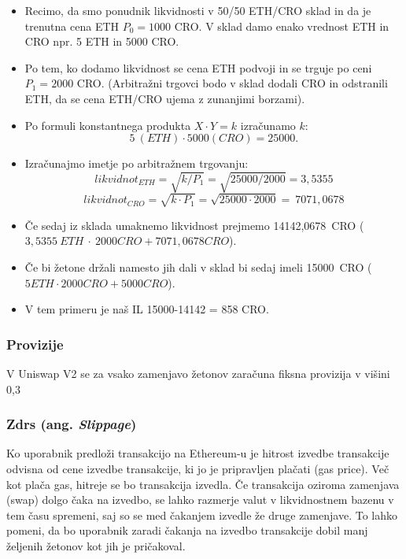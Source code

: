 \documentclass[a4paper,12pt]{article}%
\begin{document}
\begin{itemize}
    \item Recimo, da smo ponudnik likvidnosti v 50/50 ETH/CRO sklad in da je trenutna cena ETH $P_0 = 1000$ CRO. V sklad damo enako vrednost ETH in CRO npr. 5 ETH in 5000 CRO. 
    \item Po tem, ko dodamo likvidnost se cena ETH podvoji in se trguje po ceni $P_1 = 2000$ CRO. (Arbitražni trgovci bodo v sklad dodali CRO in odstranili ETH, da se cena ETH/CRO ujema z zunanjimi borzami).
    \item Po formuli konstantnega produkta $X \cdot Y=k$ izračunamo $k$: $$5~(ETH) \cdot 5000 (CRO) = 25000.$$
    \item Izračunajmo imetje po arbitražnem trgovanju:
        $$likvidnot_{ETH} = \sqrt{k/P_1} = \sqrt{25000/2000}= 3,5355$$
        $$likvidnot_{CRO} = \sqrt{k \cdot P_1} = \sqrt{25000 \cdot 2000}=~7071,0678$$
        
    \item Če sedaj iz sklada umaknemo likvidnost prejmemo 14142,0678~CRO
    ($3,5355~ETH~\cdot~2000 CRO + 7071,0678 CRO$).
    \item Če bi žetone držali namesto jih dali v sklad bi sedaj imeli 15000~CRO ($5 ETH \cdot 2000 CRO + 5000 CRO$).
    \item V tem primeru je naš IL 15000-14142 = 858 CRO.


\end{itemize}

\subsubsection{ Provizije}
V Uniswap V2 se za vsako zamenjavo žetonov zaračuna fiksna provizija v višini 0,3 %

\subsubsection{Zdrs (ang. \textit{Slippage})}

Ko uporabnik predloži transakcijo na Ethereum-u je hitrost izvedbe transakcije odvisna od cene izvedbe transakcije, ki jo je pripravljen plačati (gas price). Več kot plača gas, hitreje se bo transakcija izvedla. Če transakcija oziroma zamenjava (swap) dolgo čaka na izvedbo, se lahko razmerje valut v likvidnostnem bazenu v tem času spremeni, saj so se med čakanjem izvedle že druge zamenjave. To lahko pomeni, da bo uporabnik zaradi čakanja na izvedbo transakcije dobil manj željenih žetonov kot jih je pričakoval. 
\end{document}

